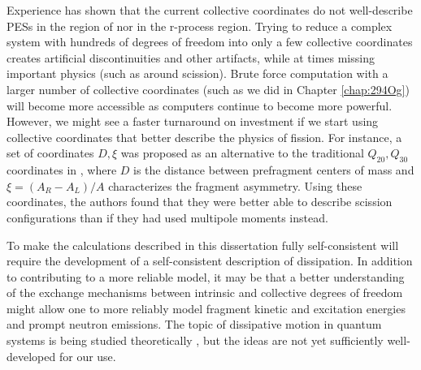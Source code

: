 Experience has shown that the current collective coordinates do not well-describe PESs in the region of {\Pt} nor in the r-process region. Trying to reduce a complex system with hundreds of degrees of freedom into only a few collective coordinates creates artificial discontinuities and other artifacts, while at times missing important physics (such as around scission). Brute force computation with a larger number of collective coordinates (such as we did in Chapter \ref{chap:294Og}) will become more accessible as computers continue to become more powerful. However, we might see a faster turnaround on investment if we start using collective coordinates that better describe the physics of fission. For instance, a set of coordinates $D, \xi$ was proposed as an alternative to the traditional $Q_{20}, Q_{30}$ coordinates in \cite{Younes2012}, where $D$ is the distance between prefragment centers of mass and $\xi = (A_R-A_L)/A$ characterizes the fragment asymmetry. Using these coordinates, the authors found that they were better able to describe scission configurations than if they had used multipole moments instead. %


To make the calculations described in this dissertation fully self-consistent will require the development of a self-consistent description of dissipation. In addition to contributing to a more reliable model, it may be that a better understanding of the exchange mechanisms between intrinsic and collective degrees of freedom might allow one to more reliably model fragment kinetic and excitation energies and prompt neutron emissions. The topic of dissipative motion in quantum systems is being studied theoretically \cite{Koch2008, Lacroix2008, Hupin2010, Sargsyan2010}, but the ideas are not yet sufficiently well-developed for our use.



